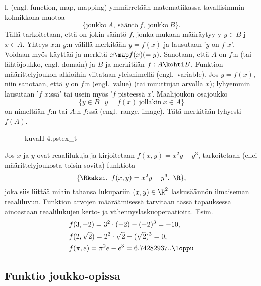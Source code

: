  l.  (engl. function, map, mapping) ymmärretään matematiikassa
tavallisimmin kolmikkona muotoa
\[
\{\text{joukko} \ A, \ \text{sääntö} \ f, \ \text{joukko} \ B\}.
\]
Tällä tarkoitetaan, että on jokin sääntö $f$, jonka mukaan määräytyy y
$y \in B$ j $x \in A$. Yhteys $x$:n $y$:n välillä merkitään $y=f(x)$ ja
lausutaan '$y$ on $f$ $x$'. Voidaan myös käyttää  ja merkitä 
$x \map f(x) (=y)$. Sanotaan, että $A$ on $f$:n
 (tai lähtöjoukko,
engl. domain) ja $B$  ja merkitään $f:A \kohti B$. Funktion määrittelyjoukon
alkioihin viitataan yleisnimellä  (engl.\ variable). Jos $y=f(x)$, niin sanotaan,
että $y$ on $f$:n  (engl.\ value)  (tai muuttujan arvolla $x$);
lyhyemmin lausutaan '$f$ $x$:ssä' tai usein myös '$f$ pisteessä $x$'. Maalijoukon osajoukko
\[
\{y \in B \ | \ y=f(x) \ \text{jollakin} \ x \in A\}
\]
on nimeltään $f$:n  tai $A$:n  $f$:ssä (engl.\ range, image). Tätä 
merkitään lyhyesti $f(A)$. 
\begin{figure}[H]
\begin{center}
{kuvaII-4.pstex_t}
\end{center}
\end{figure}
\begin{Exa}
Jos $x$ ja $y$ ovat reaalilukuja ja kirjoitetaan $f(x,y)=x^2y-y^3$, tarkoitetaan (ellei 
määrittelyjoukosta toisin sovita) funktiota
\[
\{ \Rkaksi, \ f(x,y)=x^2y-y^3, \ \R \},
\]
joka siis liittää mihin tahansa lukupariin $(x,y)\in\R^2$ laskusäännön ilmaiseman reaaliluvun.
Funktion arvojen määräämisessä tarvitaan tässä tapauksessa ainoastaan reaalilukujen 
kerto- ja vähennyslaskuoperaatioita. Esim.
\begin{align*}
&f(3,-2)=3^2 \cdot (-2) - (-2)^3 = -10, \\
&f(2,\sqrt{2})=2^2\cdot\sqrt{2}-(\sqrt{2})^3=0, \\
&f(\pi,e)=\pi^2 e - e^3=6.74282937.. \loppu
\end{align*}
\end{Exa}

\subsection{Funktio joukko-opissa}

